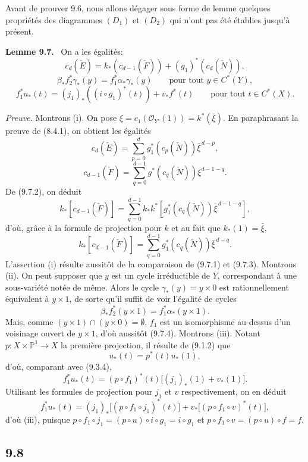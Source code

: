 \documentclass[11pt]{article}
\newenvironment{statement}[1]{\par\medskip\noindent\textbf{#1.}\ }{\par\medskip}
\begin{document}
Avant de prouver 9.6, nous allons dégager sous forme de lemme quelques propriétés des diagrammes $(D_1)$ et $(D_2)$ qui n'ont pas été établies jusqu'à présent.

\begin{statement}{Lemme 9.7}
On a les égalités:
\[
c_d(\check E)=k_*(c_{d-1}(\check F))+(g_1)^*(c_d(\check N)),
\tag{9.7 i}
\]
\[
\beta_*f_2^*\gamma_*(y)=f_1^*\alpha_*\gamma_*(y)\qquad\text{pour tout }y\in C^*(Y),
\tag{9.7 ii}
\]
\[
f_1^*u_*(t)=(j_1)_*((i\circ g_1)^*(t))+v_*f^*(t)\qquad\text{pour tout }t\in C^*(X).
\tag{9.7 iii}
\]
\end{statement}

\emph{Preuve.} Montrons (i). On pose $\xi=c_1(\mathcal O_{Y'}(1))=k^*(\bar\xi)$. En paraphrasant la preuve de (8.4.1), on obtient les égalités
\[
c_d(\check E)=\sum_{p=0}^d g_1^*(c_p(\check N))\bar\xi^{\,d-p},
\tag{9.7.1}
\]
\[
c_{d-1}(\check F)=\sum_{q=0}^{d-1}g^*(c_q(\check N))\xi^{d-1-q}.
\tag{9.7.2}
\]
De (9.7.2), on déduit
\[
k_*[c_{d-1}(\check F)]
=\sum_{q=0}^{d-1}k_*k^*[g_1^*(c_q(\check N))\bar\xi^{\,d-1-q}],
\]
d'où, grâce à la formule de projection pour $k$ et au fait que $k_*(1)=\bar\xi$,
\[
k_*[c_{d-1}(\check F)]=\sum_{q=0}^{d-1}g_1^*(c_q(\check N))\bar\xi^{\,d-q}.
\tag{9.7.3}
\]
L'assertion (i) résulte aussitôt de la comparaison de (9.7.1) et (9.7.3). Montrons (ii). On peut supposer que $y$ est un cycle irréductible de $Y$, correspondant à une sous-variété notée de même. Alors le cycle $\gamma_*(y)=y\times0$ est rationnellement équivalent à $y\times1$, de sorte qu'il suffit de voir l'égalité de cycles
\[
\beta_*f_2^*(y\times1)=f_1^*\alpha_*(y\times1).
\tag{9.7.4}
\]
Mais, comme $(y\times1)\cap(y\times0)=\emptyset$, $f_1$ est un isomorphisme au-dessus d'un voisinage ouvert de $y\times1$, d'où aussitôt (9.7.4). Montrons (iii). Notant $p:X\times\mathbb P^1\to X$ la première projection, il résulte de (9.1.2) que
\[
u_*(t)=p^*(t)u_*(1),
\tag{9.7.5}
\]
d'où, comparant avec (9.3.4),
\[
f_1^*u_*(t)=(p\circ f_1)^*(t)\bigl[(j_1)_*(1)+v_*(1)\bigr].
\tag{9.7.6}
\]
Utilisant les formules de projection pour $j_1$ et $v$ respectivement, on en déduit
\[
f_1^*u_*(t)=(j_1)_*\bigl[(p\circ f_1\circ j_1)^*(t)\bigr]+v_*\bigl[(p\circ f_1\circ v)^*(t)\bigr],
\tag{9.7.7}
\]
d'où (iii), puisque $p\circ f_1\circ j_1=(p\circ u)\circ i\circ g_1=i\circ g_1$ et $p\circ f_1\circ v=(p\circ u)\circ f=f$.

\subsection*{9.8}
\end{document}
